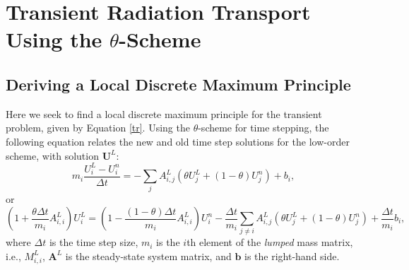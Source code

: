 \section{Transient Radiation Transport Using the $\theta$-Scheme}
\subsection{Deriving a Local Discrete Maximum Principle}
Here we seek to find a local discrete maximum principle for the transient problem, given by
Equation \ref{tr}.
Using the $\theta$-scheme for time stepping, the following equation relates the new and old
time step solutions for the low-order scheme, with solution $\mathbf{U}^L$:
\begin{equation}
   m_i\frac{U_i^L-U_i^n}{\Delta t} = -\sum\limits_j A^L_{i,j}
    \left(\theta U_j^L + (1-\theta) U_j^n\right) + b_i,
\end{equation}
or
\begin{equation}\label{theta_newstep}
   \left(1+\frac{\theta\Delta t}{m_i}A_{i,i}^L\right)U_i^L
    = \left(1-\frac{(1-\theta)\Delta t}{m_i}A_{i,i}^L\right)U_i^n
    -\frac{\Delta t}{m_i}\sum\limits_{j\ne i}A_{i,j}^L
     \left(\theta U_j^L + (1-\theta) U_j^n\right)
    +\frac{\Delta t}{m_i}b_i,
\end{equation}
where $\Delta t$ is the time step size, $m_i$ is the $i$th element of the \emph{lumped} mass
matrix, i.e., $M^L_{i,i}$, $\mathbf{A}^L$ is the steady-state system matrix, and
$\mathbf{b}$ is the right-hand side.

